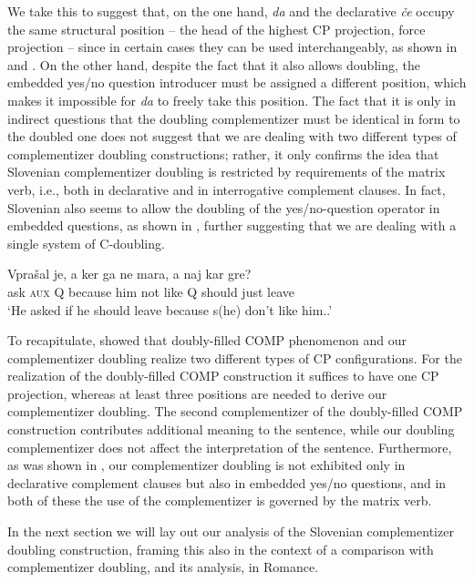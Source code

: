 \documentclass[output=paper,
]{langscibook}
\begin{document}
\noindent We take this to suggest that, on the one hand, \textit{da} and the declarative \textit{če} occupy the same structural position -- the head of the highest CP projection, force projection -- since in certain cases they can be used interchangeably, as shown in  and . On the other hand, despite the fact that it also allows doubling, the embedded yes/no question introducer must be assigned a different position, which makes it impossible for \textit{da} to freely take this position. The fact that it is only in indirect questions that the doubling complementizer must be identical in form to the doubled one does not suggest that we are dealing with two different types of complementizer doubling constructions; rather, it only confirms the idea that Slovenian complementizer doubling is restricted by requirements of the matrix verb, i.e., both in declarative and in interrogative complement clauses. In fact, Slovenian also seems to allow the doubling of the yes/no-question operator in embedded questions, as shown in , further suggesting that we are dealing with a single system of C-doubling.

\begin{exe} 
\ex \label{ex:plesnicar:thirtyfour}
\gll Vprašal je, a 	ker ga 	ne 	mara, 	a 	naj 	kar 	gre?\\
   ask \textsc{aux} Q because him	not	like Q	should	just	leave\\
\trans `He asked if he should leave because s(he) don’t like him..'
\end{exe}

\noindent To recapitulate,  showed that  doubly-filled COMP phenomenon and our complementizer doubling realize two different types of CP configurations. For the realization of the doubly-filled COMP construction it suffices to have one CP projection, whereas at least three positions are needed to derive our complementizer doubling. The second complementizer of the doubly-filled COMP construction contributes additional meaning to the sentence, while our doubling complementizer does not affect the interpretation of the sentence. Furthermore, as was shown in , our complementizer doubling is not exhibited only in declarative complement clauses but also in embedded yes/no questions, and in both of these the use of the complementizer is governed by the matrix verb.

In the next section we will lay out our analysis of the Slovenian complementizer doubling construction, framing this also in the context of a comparison with complementizer doubling, and its analysis, in Romance. 
\end{document}
